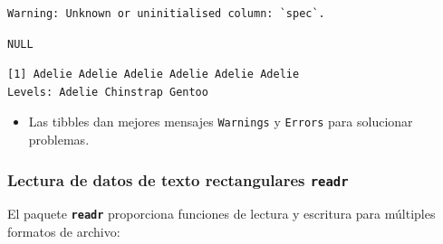 \documentclass[
  letterpaper,
  DIV=11,
  numbers=noendperiod]{scrreprt}
\newenvironment{Shaded}{\begin{snugshade}}{\end{snugshade}}
\newcommand{\FunctionTok}[1]{\textcolor[rgb]{0.28,0.35,0.67}{#1}}
\newcommand{\NormalTok}[1]{\textcolor[rgb]{0.00,0.23,0.31}{#1}}
\newcommand{\SpecialCharTok}[1]{\textcolor[rgb]{0.37,0.37,0.37}{#1}}
\providecommand{\tightlist}{%
  \setlength{\itemsep}{0pt}\setlength{\parskip}{0pt}}\usepackage{longtable,booktabs,array}
\begin{document}
\begin{Shaded}
\end{Shaded}

\begin{verbatim}
Warning: Unknown or uninitialised column: `spec`.
\end{verbatim}

\begin{verbatim}
NULL
\end{verbatim}

\begin{Shaded}
\end{Shaded}

\begin{verbatim}
[1] Adelie Adelie Adelie Adelie Adelie Adelie
Levels: Adelie Chinstrap Gentoo
\end{verbatim}

\begin{itemize}
\tightlist
\item
  Las tibbles dan mejores mensajes \texttt{Warnings} y \texttt{Errors}
  para solucionar problemas.
\end{itemize}

\hypertarget{lectura-de-datos-de-texto-rectangulares-readr}{%
\subsubsection{\texorpdfstring{Lectura de datos de texto rectangulares
\texttt{readr}}{Lectura de datos de texto rectangulares readr}}\label{lectura-de-datos-de-texto-rectangulares-readr}}

El paquete \textbf{\texttt{readr}} proporciona funciones de lectura y
escritura para múltiples formatos de archivo:
\end{document}
